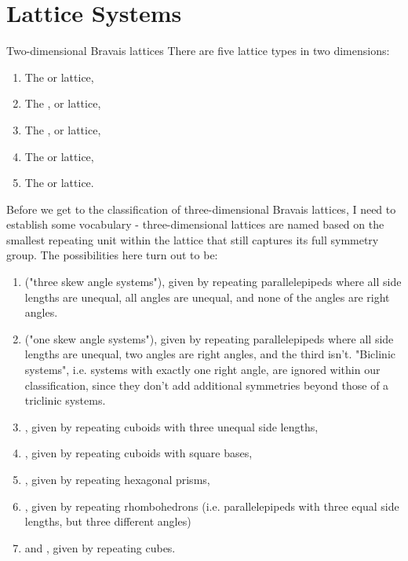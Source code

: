 \section{Lattice Systems}
\begin{importanttheorem}{Two-dimensional Bravais lattices}{}
	There are five lattice types in two dimensions:
	\begin{enumerate}
		\item The  or  lattice,
		\item The ,  or  lattice,
		\item The ,  or  lattice,
		\item The  or  lattice,
		\item The  or  lattice.
	\end{enumerate}
\end{importanttheorem}
Before we get to the classification of three-dimensional Bravais lattices, I need to establish some vocabulary - three-dimensional lattices are named based on the smallest repeating unit within the lattice that still captures its full symmetry group. The possibilities here turn out to be:
\begin{enumerate}
	\item {} ("three skew angle systems"), given by repeating parallelepipeds where all side lengths are unequal, all angles are unequal, and none of the angles are right angles.
	\item {} ("one skew angle systems"), given by repeating parallelepipeds where all side lengths are unequal, two angles are right angles, and the third isn't. "Biclinic systems", i.e. systems with exactly one right angle, are ignored within our classification, since they don't add additional symmetries beyond those of a triclinic systems.
	\item {}, given by repeating cuboids with three unequal side lengths,
	\item {}, given by repeating cuboids with square bases,
	\item {}, given by repeating hexagonal prisms,
	\item {}, given by repeating rhombohedrons (i.e. parallelepipeds with three equal side lengths, but three different angles)
	\item and , given by repeating cubes.
\end{enumerate}
\fi

